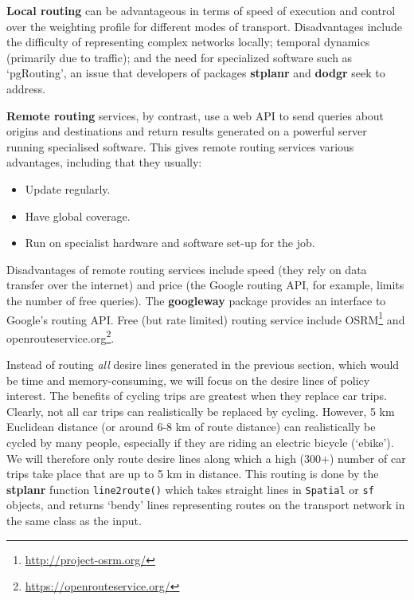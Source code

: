 \documentclass[]{krantz}
\newenvironment{Shaded}{\begin{snugshade}}{\end{snugshade}}
\newcommand{\DecValTok}[1]{\textcolor[rgb]{0.06,0.06,0.06}{#1}}
\newcommand{\KeywordTok}[1]{\textcolor[rgb]{0.27,0.27,0.27}{\textbf{#1}}}
\newcommand{\NormalTok}[1]{#1}
\newcommand{\OperatorTok}[1]{\textcolor[rgb]{0.43,0.43,0.43}{\textbf{#1}}}
\newcommand{\StringTok}[1]{\textcolor[rgb]{0.5,0.5,0.5}{#1}}
\providecommand{\tightlist}{%
  \setlength{\itemsep}{0pt}\setlength{\parskip}{0pt}}
\let\rmarkdownfootnote\footnote%
\def\footnote{\protect\rmarkdownfootnote}
\renewcommand{\href}[2]{#2\footnote{\url{#1}}}
\begin{document}
\textbf{Local routing} can be advantageous in terms of speed of execution and control over the weighting profile for different modes of transport.
Disadvantages include the difficulty of representing complex networks locally; temporal dynamics (primarily due to traffic); and the need for specialized software such as `pgRouting', an issue that developers of packages \textbf{stplanr} and \textbf{dodgr} seek to address.

\textbf{Remote routing} services, by contrast, use a web API to send queries about origins and destinations and return results generated on a powerful server running specialised software.
This gives remote routing services various advantages, including that they usually:

\begin{itemize}
\tightlist
\item
  Update regularly.
\item
  Have global coverage.
\item
  Run on specialist hardware and software set-up for the job.
\end{itemize}

Disadvantages of remote routing services include speed (they rely on data transfer over the internet) and price (the Google routing API, for example, limits the number of free queries).
The \textbf{googleway} package provides an interface to Google's routing API.
Free (but rate limited) routing service include \href{http://project-osrm.org/}{OSRM} and \href{https://openrouteservice.org/}{openrouteservice.org}.

Instead of routing \emph{all} desire lines generated in the previous section, which would be time and memory-consuming, we will focus on the desire lines of policy interest.
The benefits of cycling trips are greatest when they replace car trips.
Clearly, not all car trips can realistically be replaced by cycling.
However, 5 km Euclidean distance (or around 6-8 km of route distance) can realistically be cycled by many people, especially if they are riding an electric bicycle (`ebike').
We will therefore only route desire lines along which a high (300+) number of car trips take place that are up to 5 km in distance.
This routing is done by the \textbf{stplanr} function \texttt{line2route()} which takes straight lines in \texttt{Spatial} or \texttt{sf} objects, and returns `bendy' lines representing routes on the transport network in the same class as the input.

\begin{Shaded}
\end{Shaded}
\end{document}
